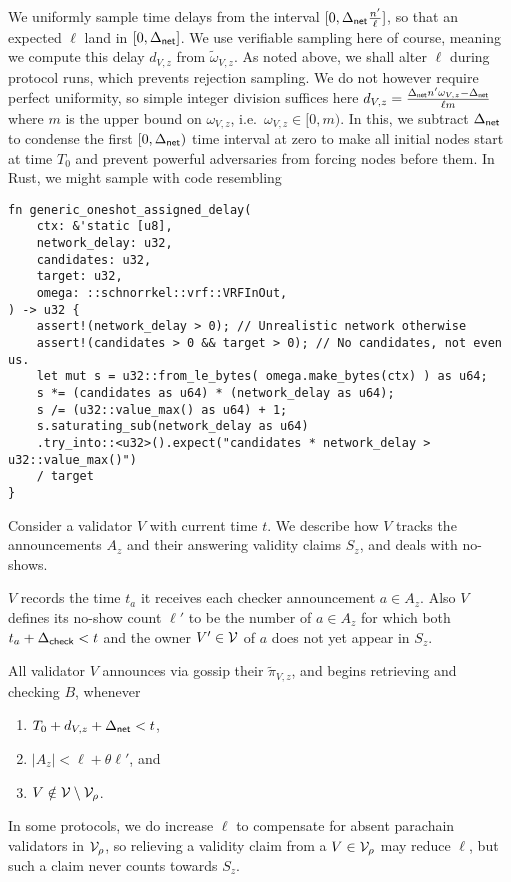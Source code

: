 We uniformly sample time delays from the interval $[0,\Delta_{\mathsf{net}} {n' \over \ell}]$, so that an expected $\ell$ land in $[0,\Delta_{\mathsf{net}}]$.  We use verifiable sampling here of course, meaning we compute this delay $d_{V,z}$ from $\tilde{\omega}_{V,z}$.  
%
As noted above, we shall alter $\ell$ during protocol runs, which prevents rejection sampling.  We do not however require perfect uniformity, so simple integer division suffices here $d_{V,z} = {\Delta_{\mathsf{net}} n' \omega_{V,z} - \Delta_{\mathsf{net}} \over \ell m}$ where $m$ is the upper bound on $\omega_{V,z}$, i.e.\ $\omega_{V,z} \in [0,m)$.  
%
In this, we subtract $\Delta_{\mathsf{net}}$ to condense the first $[0,\Delta_{\mathsf{net}})$ time interval at zero to make all initial nodes start at time $T_0$ and prevent powerful adversaries from forcing nodes before them. 
%
In Rust, we might sample with code resembling
\begin{verbatim}
fn generic_oneshot_assigned_delay(
    ctx: &'static [u8],
    network_delay: u32, 
    candidates: u32,
    target: u32,
    omega: ::schnorrkel::vrf::VRFInOut,
) -> u32 {
    assert!(network_delay > 0); // Unrealistic network otherwise
    assert!(candidates > 0 && target > 0); // No candidates, not even us.
    let mut s = u32::from_le_bytes( omega.make_bytes(ctx) ) as u64;
    s *= (candidates as u64) * (network_delay as u64);
    s /= (u32::value_max() as u64) + 1;
    s.saturating_sub(network_delay as u64)
    .try_into::<u32>().expect("candidates * network_delay > u32::value_max()")
    / target
}
\end{verbatim}

Consider a validator $V$ with current time $t$.  We describe how $V$ tracks the announcements $A_z$ and their answering validity claims $S_z$, and deals with no-shows.

$V$ records the time $t_a$ it receives each checker announcement $a \in A_z$.  Also $V$ defines its no-show count $\ell'$ to be the number of $a \in A_z$ for which both $t_a + \Delta_{\mathsf{check}} < t$ and the owner $V'\in \mathcal{V}$ of $a$ does not yet appear in $S_z$.

All validator $V$ announces via gossip their $\tilde{\pi}_{V,z}$, and begins retrieving and checking $B$, whenever
\begin{enumerate}
\item $T_0 + d_{V,z} + \Delta_{\mathsf{net}} < t$,
\item $|A_z| < \ell + \theta \ell'$, and
\item $V \notin \mathcal{V} \setminus \mathcal{V}_\rho$.
\end{enumerate}
In some protocols, we do increase $\ell$ to compensate for absent parachain validators in $\mathcal{V}_\rho$, so relieving a validity claim from a $V \in \mathcal{V}_\rho$ may reduce $\ell$, but such a claim never counts towards $S_z$.

